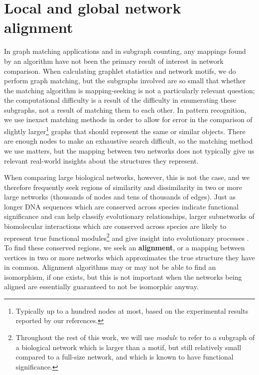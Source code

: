 \documentclass[12pt]{thesis}
\theoremstyle{plain}
\theoremstyle{definition}
\theoremstyle{remark}
\begin{document}
\section{Local and global network alignment}

In graph matching applications and in subgraph counting, any mappings found by an algorithm have not been the primary result of interest in network comparison. When calculating graphlet statistics and network motifs, we do perform graph matching, but the subgraphs involved are so small that whether the matching algorithm is mapping-seeking is not a particularly relevant question; the computational difficulty is a result of the difficulty in enumerating these subgraphs, not a result of matching them to each other. In pattern recognition, we use inexact matching methods in order to allow for error in the comparison of slightly larger\footnote{Typically up to a hundred nodes at most, based on the experimental results reported by our references.} graphs that should represent the same or similar objects. There are enough nodes to make an exhaustive search difficult, so the matching method we use matters, but the mapping between two networks does not typically give us relevant real-world insights about the structures they represent.

When comparing large biological networks, however, this is not the case, and we therefore frequently seek regions of similarity and dissimilarity in two or more large networks (thousands of nodes and tens of thousands of edges). Just as longer DNA sequences which are conserved across species indicate functional significance and can help classify evolutionary relationships, larger subnetworks of biomolecular interactions which are conserved across species are likely to represent true functional modules\footnote{Throughout the rest of this work, we will use \textit{module} to refer to a subgraph of a biological network which is larger than a motif, but still relatively small compared to a full-size network, and which is known to have functional significance.}  \cite{Sharan_2006} and give insight into evolutionary processes \cite{Ali_2014}. To find these conserved regions, we seek an \textbf{alignment}, or a mapping between vertices in two or more networks which approximates the true structure they have in common. Alignment algorithms may or may not be able to find an isomorphism, if one exists, but this is not important when the networks being aligned are essentially guaranteed to not be isomorphic anyway.
\end{document}

